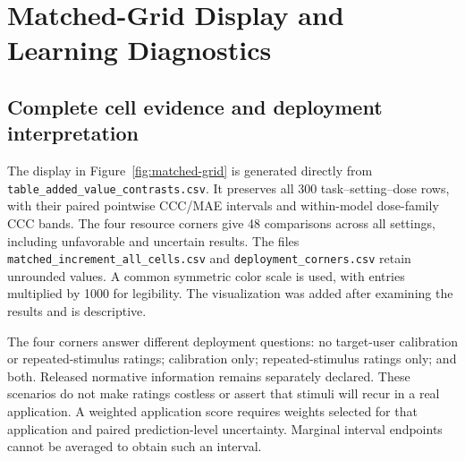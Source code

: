 \section{Matched-Grid Display and Learning Diagnostics}
\label{app:revision-diagnostics}

\subsection{Complete cell evidence and deployment interpretation}
The display in Figure~\ref{fig:matched-grid} is generated directly from
\texttt{table\_added\_value\_contrasts.csv}. It preserves all 300
task--setting--dose rows, with their paired pointwise CCC/MAE intervals and
within-model dose-family CCC bands. The four resource corners give 48
comparisons across all settings, including unfavorable and uncertain results.
The files \texttt{matched\_increment\_all\_cells.csv} and
\texttt{deployment\_corners.csv} retain unrounded values. A common symmetric
color scale is used, with entries multiplied by 1000 for legibility.
The visualization was added after examining the results and is descriptive.

The four corners answer different deployment questions: no target-user
calibration or repeated-stimulus ratings; calibration only; repeated-stimulus
ratings only; and both. Released normative information remains separately
declared. These scenarios do not make ratings costless or assert that stimuli
will recur in a real application. A weighted application score requires
weights selected for that application and paired prediction-level uncertainty.
Marginal interval endpoints cannot be averaged to obtain such an interval.


